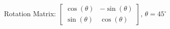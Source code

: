 \documentclass[preview]{standalone}
\begin{document}
\begin{center}
Rotation Matrix: $\begin{bmatrix} \cos(\theta) & -\sin(\theta) \\ \sin(\theta) & \cos(\theta) \end{bmatrix}$, $\theta = 45^\circ$
\end{center}
\end{document}
